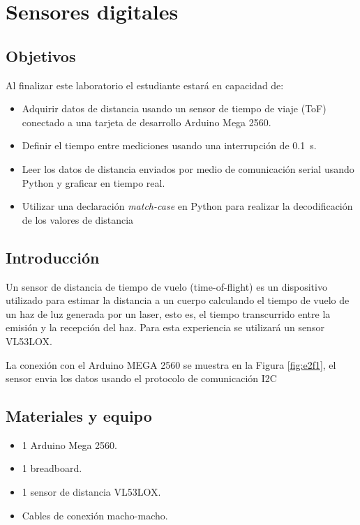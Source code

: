 \documentclass[12pt,letterpaper]{report}
\newcommand{\obj}{Objetivos}
\newcommand{\mat}{Materiales y equipo}
\newcommand{\capacidad}{Al finalizar este laboratorio el estudiante estará en capacidad de:}
\begin{document}
\renewcommand{\appendixname}{Taller}
\renewcommand{\appendixtocname}{Taller}
\renewcommand{\appendixpagename}{Taller}

\appendix
\renewcommand{\thechapter}{\Roman{chapter}}



\chapter{Sensores digitales}
\section{\obj}
\capacidad
\begin{itemize}
\item Adquirir datos de distancia usando un sensor de tiempo de viaje (ToF) conectado a una tarjeta de desarrollo Arduino Mega 2560.
\item Definir el tiempo entre mediciones usando una interrupción de \SI{0.1}{\second}.
\item Leer los datos de distancia enviados por medio de comunicación serial usando Python y graficar en tiempo real.
\item Utilizar una declaración \emph{match-case} en Python para realizar la decodificación de los valores de distancia
\end{itemize}

\section{Introducción}

Un sensor de distancia de tiempo de vuelo (time-of-flight) es un dispositivo utilizado para estimar la distancia a un cuerpo calculando el tiempo de vuelo de un haz de luz generada por un laser, esto es, el tiempo transcurrido entre la emisión y la recepción del haz. Para esta experiencia se utilizará un sensor VL53LOX. 

La conexión con el Arduino MEGA 2560 se muestra en la Figura \ref{fig:e2f1}, el sensor envia los datos usando el protocolo de comunicación I2C    


\section{\mat}
\begin{itemize}
\item 1 Arduino Mega 2560.
\item 1 breadboard.
\item 1 sensor de distancia VL53LOX.
\item Cables de conexión macho-macho.
\end{itemize}
\end{document}
